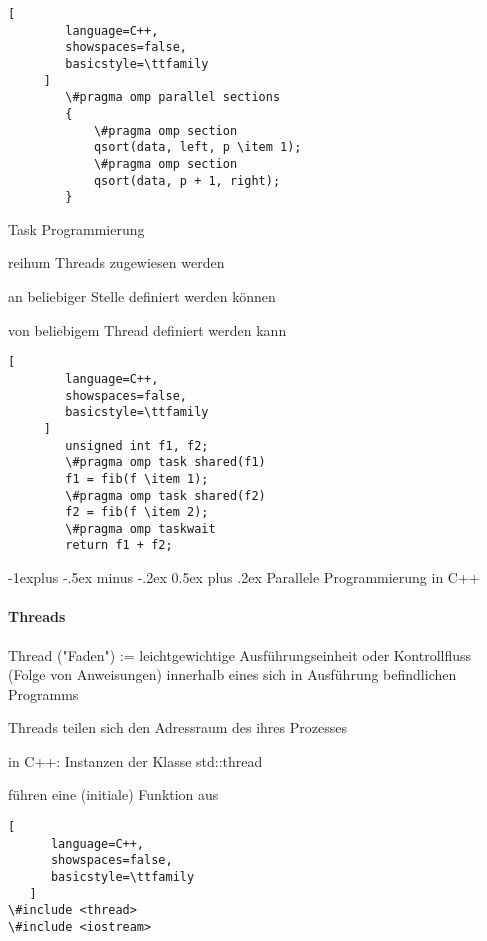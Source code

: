 \documentclass[10pt]{article}
\makeatletter
\renewcommand{\subsection}{\@startsection{subsection}{2}{0mm}%
                                {-1explus -.5ex minus -.2ex}%
                                {0.5ex plus .2ex}%
                                {\normalfont\normalsize\bfseries}}
\makeatother
\begin{document}
\begin{itemize*}
\begin{itemize*}
  \begin{lstlisting}[
        language=C++,
        showspaces=false,
        basicstyle=\ttfamily
     ]
        \#pragma omp parallel sections
        {
            \#pragma omp section
            qsort(data, left, p \item 1);
            \#pragma omp section
            qsort(data, p + 1, right);
        }
    \end{lstlisting}
  \item Task Programmierung
  \begin{itemize*}
    \item reihum Threads zugewiesen werden
    \item an beliebiger Stelle definiert werden können
    \item von beliebigem Thread definiert werden kann
  \end{itemize*}
  \begin{lstlisting}[
        language=C++,
        showspaces=false,
        basicstyle=\ttfamily
     ]
        unsigned int f1, f2;
        \#pragma omp task shared(f1)
        f1 = fib(f \item 1);
        \#pragma omp task shared(f2)
        f2 = fib(f \item 2);
        \#pragma omp taskwait
        return f1 + f2;
    \end{lstlisting}
\end{itemize*}


\subsection{Parallele Programmierung in C++}
\paragraph{Threads}
Thread ("Faden") := leichtgewichtige Ausführungseinheit oder Kontrollfluss (Folge von Anweisungen) innerhalb eines sich in Ausführung befindlichen Programms
\begin{itemize*}
  \item Threads teilen sich den Adressraum des ihres Prozesses
  \item in C++: Instanzen der Klasse std::thread
  \item führen eine (initiale) Funktion aus
\end{itemize*}

\begin{lstlisting}[
      language=C++,
      showspaces=false,
      basicstyle=\ttfamily
   ]
\#include <thread>
\#include <iostream>


\end{lstlisting}
\end{itemize*}
\end{document}

